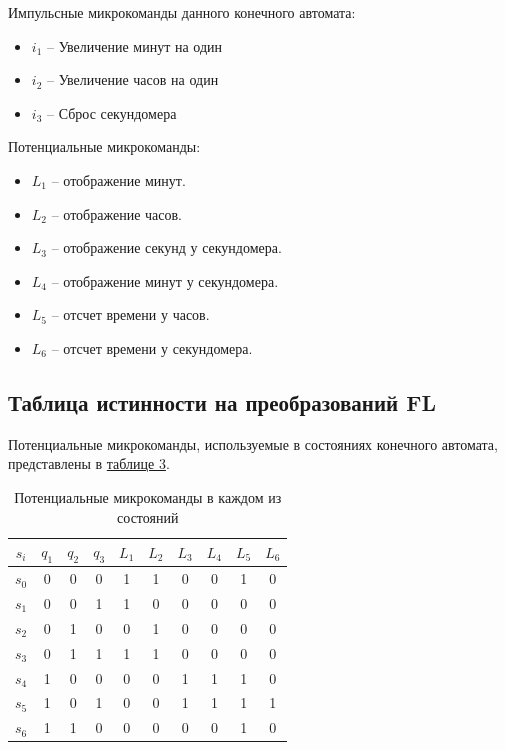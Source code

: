 \documentclass[10pt,a4paper,final]{article} %
\begin{document}
\noindent Импульсные микрокоманды данного конечного автомата:
\begin{itemize}
	\item $i_1$ -- Увеличение минут на один   
	\item $i_2$ -- Увеличение часов на один  
	\item $i_3$ -- Сброс секундомера 
\end{itemize}

\noindent Потенциальные микрокоманды:
\begin{itemize}
	\item $L_1$ -- отображение минут.
	\item $L_2$ -- отображение часов.
	\item $L_3$ -- отображение секунд у секундомера.
	\item $L_4$ -- отображение минут у секундомера.
	\item $L_5$ -- отсчет времени у часов.
	\item $L_6$ -- отсчет времени у секундомера.
\end{itemize}

\subsection{Таблица истинности на преобразований FL}
Потенциальные микрокоманды, используемые в состояниях конечного автомата, представлены в \hyperref[FL]{таблице 3}.

\begin{table}[htbp]
	\centering
	\begin{tabular}{|c|c c c|c c c c c c|}
		\hline
		$s_i$ &	$q_1$ & $q_2$ & $q_3$ & $L_1$ &	$L_2$ & $L_3$ & $L_4$ & $L_5$ &	$L_6$ \\
		\hline
		$s_0$ &	0 &	0 &	0 &	1 &	1 &	0 &	0 &	1 &	0 \\
		$s_1$ &	0 &	0 &	1 &	1 &	0 &	0 &	0 &	0 &	0 \\
		$s_2$ &	0 &	1 &	0 &	0 &	1 &	0 &	0 &	0 &	0 \\ 
		$s_3$ &	0 &	1 &	1 &	1 &	1 &	0 &	0 &	0 &	0 \\
		$s_4$ &	1 &	0 &	0 &	0 &	0 &	1 &	1 &	1 &	0 \\
		$s_5$ &	1 &	0 &	1 &	0 &	0 &	1 &	1 &	1 &	1 \\
		$s_6$ &	1 &	1 &	0 &	0 &	0 &	0 &	0 &	1 &	0  \\
		\hline
	\end{tabular}
			\caption{Потенциальные микрокоманды в каждом из состояний}
			\label{FL}
\end{table}
\end{document}
